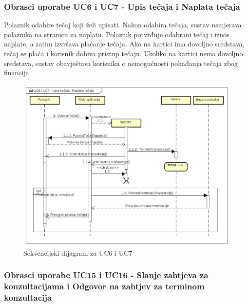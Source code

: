 				\eject
				\subsubsection{Obrasci uporabe UC6 i UC7 - Upis tečaja i Naplata tečaja}
				
					Polaznik odabire tečaj koji želi upisati. Nakon odabira tečaja, sustav usmjerava polaznika na stranicu za naplatu. \newline
					Polaznik potvrđuje odabrani tečaj i iznos naplate, a zatim izvršava plaćanje tečaja. Ako na kartici ima dovoljno sredstava, tečaj se plaća i korisnik dobiva pristup tečaju. Ukoliko na kartici nema dovoljno sredstava, sustav obavještava korisnika o nemogućnosti pohađanja tečaja zbog financija.
				
					\begin{figure}[h]
						\includegraphics[scale=0.56]{dijagrami/UML_sd_UC6UC7.PNG}
						\centering
						\caption{Sekvencijski dijagram za UC6 i UC7}
						\label{fig:UML_sd_UC6UC7}
					\end{figure}
				
				\eject
				\subsubsection{Obrasci uporabe UC15 i UC16 - Slanje zahtjeva za konzultacijama i Odgovor na zahtjev za terminom konzultacija}
				
